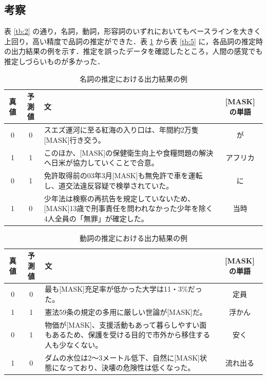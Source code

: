 \documentclass[twocolumn]{jarticle}
\begin{document}
 \subsection{考察}
 表 \ref{tb:2} の通り，名詞，動詞，形容詞のいずれにおいてもベースラインを大きく上回り，高い精度で品詞の推定ができた．表 \ref{tb:3} から表 \ref{tb:5} に，各品詞の推定時の出力結果の例を示す．推定を誤ったデータを確認したところ，人間の感覚でも推定しづらいものが多かった．


 \begin{table}[t]
 	\caption{名詞の推定における出力結果の例}
     \begin{center}
 	\begin{tabular}{|c|c|p{30em}|c|} \hline
   真値 & 予測値 & 文 & [MASK] の単語 \\ \hline \hline
   0 & 0 & スエズ運河に至る紅海の入り口は、年間約2万隻[MASK]行き交う。 & が \\ \hline
   1 & 1 & このほか、[MASK]の保健衛生向上や食糧問題の解決へ日米が協力していくことで合意。 & アフリカ  \\ \hline
   0 & 1 & 免許取得前の03年3月[MASK]も無免許で車を運転し、道交法違反容疑で検挙されていた。 & に \\ \hline
   1 & 0 & 少年法は検察の再抗告を規定していないため、[MASK]13歳で刑事責任を問われなかった少年を除く4人全員の「無罪」が確定した。 & 当時  \\ \hline
 \end{tabular}
     \end{center}
 	\label{tb:3}
\end{table}

\begin{table}[t]
 \caption{動詞の推定における出力結果の例}
    \begin{center}
 \begin{tabular}{|c|c|p{30em}|c|} \hline
  真値 & 予測値 & 文 & [MASK] の単語 \\ \hline \hline
  0 & 0 & 最も[MASK]充足率が低かった大学は11・3\%だった。 & 定員 \\ \hline
  1 & 1 & 憲法59条の規定の多用に厳しい世論が[MASK]だ。 & 浮かん  \\ \hline
  0 & 1 & 物価が[MASK]、支援活動もあって暮らしやすい面もあるため、保護を受ける目的で市外から移住する人も少なくない。 & 安く \\ \hline
  1 & 0 & ダムの水位は2〜3メートル低下、自然に[MASK]状態になっており、決壊の危険性は低くなった。 & 流れ出る  \\ \hline
\end{tabular}
    \end{center}
 \label{tb:4}
\end{table}
\end{document}
